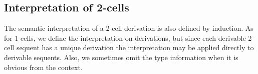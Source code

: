 \documentclass{robinthesisdraft}
\begin{document}
\subsection{Interpretation of 2-cells}\label{s-interpretation-of-2-cells}
The semantic interpretation of a 2-cell derivation is also defined by induction.
As for 1-cells, we define the interpretation on derivations, but since each
derivable 2-cell sequent has a unique derivation the interpretation may be
applied directly to derivable sequents. Also, we sometimes omit the type
information when it is obvious from the context.
\end{document}
